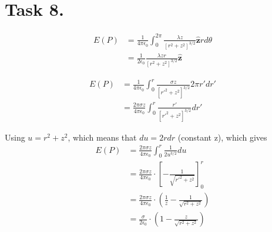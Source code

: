 \documentclass[a4paper,11pt]{article}
\begin{document}
\section*{Task 8.}
\begin{romanlist}
    \item 
    \begin{align*}
        E(P) &= \frac{1}{4\pi \epsilon_0} \int_{0}^{2\pi} \frac{\lambda z}{[r^2 + z^2]^{3/2}} \mathbf{\hat{z}} r d\theta \\
             &= \boxed{\frac{1}{2\epsilon_0} \frac{\lambda zr}{[r^2 + z^2]^{3/2}} \mathbf{\hat{z}}}
    \end{align*}

    \item 
    \begin{align*}
        E(P) &= \frac{1}{4\pi \epsilon_0} \int_{0}^{r} \frac{\sigma z}{[r'^2 + z^2]^{3/2}} 2\pi r' dr' \\
             &= \frac{2\pi \sigma z}{4\pi \epsilon_0} \int_{0}^{r} \frac{r'}{[r'^2 + z^2]^{3/2}} dr'
    \end{align*}

    Using $u = r^2 + z^2$, which means that $du = 2rdr$ (constant z), which gives
    \begin{align*}
        E(P) &= \frac{2\pi \sigma z}{4\pi \epsilon_0} \int_{0}^{r} \frac{1}{2u^{3/2}} du \\        
             &= \frac{2\pi \sigma z}{4\pi \epsilon_0} \cdot \left[-\frac{1}{\sqrt{r'^2 + z^2}}\right]_{0}^{r} \\
             &= \frac{2\pi \sigma z}{4\pi \epsilon_0} \cdot \left(\frac{1}{z} - \frac{1}{\sqrt{r^2 + z^2}}\right) \\
             &= \boxed{\frac{\sigma}{2\epsilon_0} \cdot \left(1 - \frac{z}{\sqrt{r^2 + z^2}}\right)}
    \end{align*}
\end{romanlist}
\end{document}
